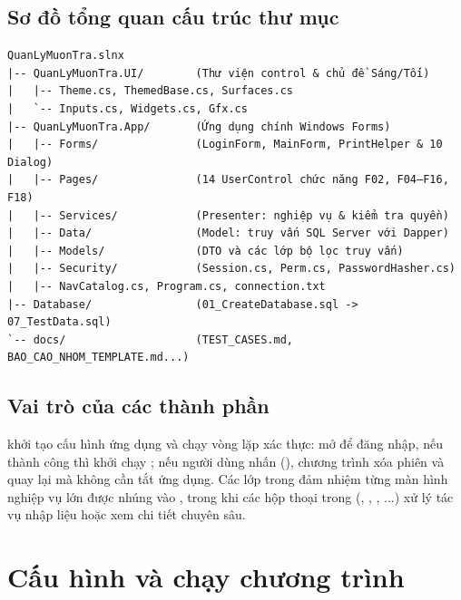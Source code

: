 \subsection{Sơ đồ tổng quan cấu trúc thư mục}

\begin{Verbatim}
QuanLyMuonTra.slnx
|-- QuanLyMuonTra.UI/        (Thư viện control & chủ đề Sáng/Tối)
|   |-- Theme.cs, ThemedBase.cs, Surfaces.cs
|   `-- Inputs.cs, Widgets.cs, Gfx.cs
|-- QuanLyMuonTra.App/       (Ứng dụng chính Windows Forms)
|   |-- Forms/               (LoginForm, MainForm, PrintHelper & 10 Dialog)
|   |-- Pages/               (14 UserControl chức năng F02, F04–F16, F18)
|   |-- Services/            (Presenter: nghiệp vụ & kiểm tra quyền)
|   |-- Data/                (Model: truy vấn SQL Server với Dapper)
|   |-- Models/              (DTO và các lớp bộ lọc truy vấn)
|   |-- Security/            (Session.cs, Perm.cs, PasswordHasher.cs)
|   |-- NavCatalog.cs, Program.cs, connection.txt
|-- Database/                (01_CreateDatabase.sql -> 07_TestData.sql)
`-- docs/                    (TEST_CASES.md, BAO_CAO_NHOM_TEMPLATE.md...)
\end{Verbatim}

\subsection{Vai trò của các thành phần}

 khởi tạo cấu hình ứng dụng và chạy vòng lặp xác thực: mở  để đăng nhập, nếu thành công thì khởi chạy ; nếu người dùng nhấn  (), chương trình xóa phiên  và quay lại  mà không cần tắt ứng dụng. Các lớp trong  đảm nhiệm từng màn hình nghiệp vụ lớn được nhúng vào , trong khi các hộp thoại trong  (, , , ...) xử lý tác vụ nhập liệu hoặc xem chi tiết chuyên sâu.


\section{Cấu hình và chạy chương trình}

